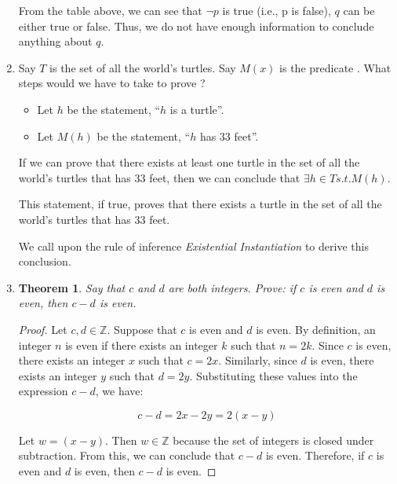 \documentclass{article}
\newtheorem{theorem}{Theorem}
\begin{document}
\begin{enumerate}
          From the table above, we can see that $\neg p$ is true (i.e., p is false), $q$
          can be either true or false. Thus, we do not have enough information to
          conclude anything about $q$.

          \newpage

    \item Say $T$ is the set of all the world's turtles. Say $M(x)$ is the predicate
          . What steps would we have to take to prove ?

          \begin{itemize}
              \item Let $h$ be the statement, ``$h$ is a turtle''.
              \item Let $M(h)$ be the statement, ``$h$ has $33$ feet''.
          \end{itemize}
          If we can prove that there exists at least one turtle in the set of all the world's turtles that has $33$ feet, then we can conclude that $\exists h \in T    s.t. M(h)$.

          This statement, if true, proves that there exists a turtle in the set of all
          the world's turtles that has $33$ feet.

          We call upon the rule of inference \textit{Existential Instantiation} to derive
          this conclusion.

          \newpage

    \item \begin{theorem}
              Say that $c$ and $d$ are both integers. Prove: if $c$ is even and $d$ is even,
              then $c-d$ is even.
          \end{theorem}

          \begin{proof}
              Let $c, d \in \mathbb{Z}$. Suppose that $c$ is even and $d$ is even. By definition,
              an integer $n$ is even if there exists an integer $k$ such that $n = 2k$. Since $c$ is
              even, there exists an integer $x$ such that $c = 2x$. Similarly, since $d$ is even,
              there exists an integer $y$ such that $d = 2y$. Substituting these values into the
              expression $c - d$, we have:

              \[c - d = 2x - 2y = 2(x - y)\]

              Let $w = (x - y)$. Then $w \in \mathbb{Z}$ because the set of integers is
              closed under subtraction. From this, we can conclude that $c - d$ is even.
              Therefore, if $c$ is even and $d$ is even, then $c - d$ is even.
          \end{proof}

\end{enumerate}
\end{document}
